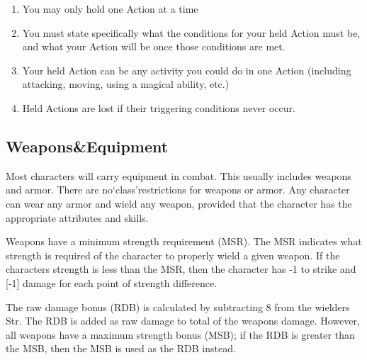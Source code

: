 \documentclass[twoside]{book}
\begin{document}
\begin{enumerate}
      
  \item 
    {  
    You may only hold one Action at a time
    }
  
  \item 
    {  
    You must state specifically what the conditions for your held Action must be, and what your Action will be once those conditions are met.
    }
  
  \item 
    {  
    Your held Action can be any activity you could do in one Action (including attacking, moving, using a magical ability, etc.)
    }
  
  \item 
    {  
    Held Actions are lost if their triggering conditions never occur.
    }
  
\end{enumerate}
  
    

\subsection{Weapons\&Equipment}
    
    {  
    Most characters will carry equipment in combat. This usually includes weapons and armor. There are no`class'restrictions for weapons or armor. Any character can wear any armor and wield any weapon, provided that the character has the appropriate attributes and skills.
    }
  
    {  
    Weapons have a minimum strength requirement (MSR). The MSR indicates what strength is required of the character to properly wield a given weapon. If the characters strength is less than the MSR, then the character has -1 to strike and [-1] damage for each point of strength difference.
    }
  
    {  
    The raw damage bonus (RDB) is calculated by subtracting 8 from the wielders Str. The RDB is added as raw damage to total of the weapons damage. However, all weapons have a maximum strength bonus (MSB); if the RDB is greater than the MSB, then the MSB is used as the RDB instead.
    }
  
  

  
\end{document}
